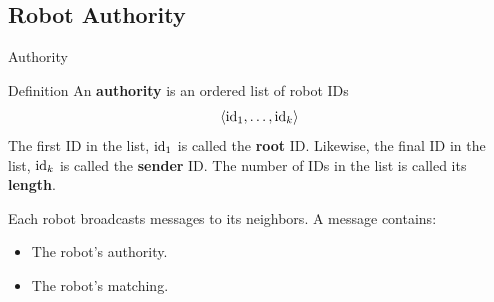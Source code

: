\documentclass[10pt]{beamer}
\newcommand{\id}{{\rm id}}
\begin{document}
\subsection{Robot Authority}
\begin{frame}{Authority}
  \begin{block}{}
    \begin{bclogo}[couleur=orange!10, arrondi=0.2, ombre=true]{Definition} 
      An \textbf{authority} is an ordered list of robot IDs
      $$ \langle \id_1, \ldots, \id_k \rangle $$
      The first ID in the list, $\id_1$ is called the \textbf{root} ID.
      Likewise, the final ID in the list, $\id_k$ is called the
      \textbf{sender} ID.  The number of IDs in the list is called
      its \textbf{length}.
    \end{bclogo}
  \end{block}
  \begin{block}{Each robot broadcasts messages to its neighbors.}
    A message contains:\\
  \begin{itemize}
    \item The robot's authority.
    \item The robot's matching.
  \end{itemize}
  \end{block}
\end{frame}
\end{document}
